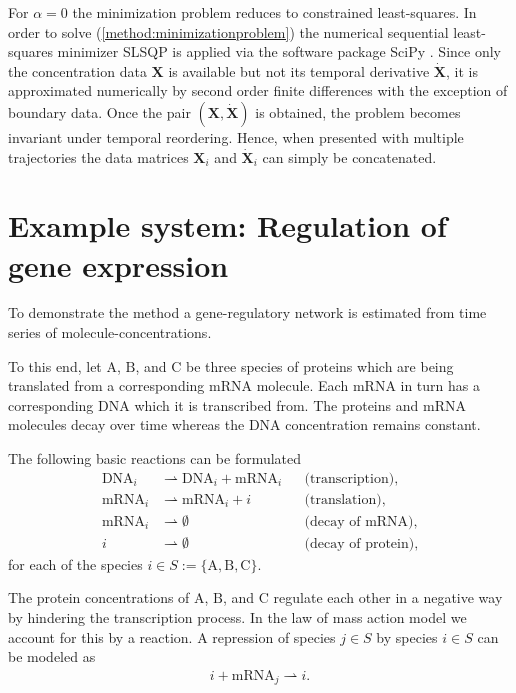 \documentclass[oneside, abstracton, titlepage]{scrartcl}
\begin{document}
	For $\alpha=0$ the minimization problem reduces to constrained least-squares. In order to solve (\ref{method:minimizationproblem}) the numerical sequential least-squares minimizer SLSQP \cite{Kraft1988} is applied via the software package SciPy \cite{SciPy}. Since only the concentration data $\mathbf{X}$ is available but not its temporal derivative $\dot{\mathbf{X}}$, it is approximated numerically by second order finite differences with the exception of boundary data. Once the pair $(\mathbf{X}, \dot{\mathbf{X}})$ is obtained, the problem becomes invariant under temporal reordering. Hence, when presented with multiple trajectories the data matrices $\mathbf{X}_i$ and $\dot{\mathbf{X}}_i$ can simply be concatenated.
	
    \section{Example system: Regulation of gene expression}\label{sec:generegulation}

    To demonstrate the method a gene-regulatory network is estimated from time series of molecule-concentrations.
    
    To this end, let $\mathrm{A}$, $\mathrm{B}$, and $\mathrm{C}$ be three species of proteins which are being translated from a corresponding $\mathrm{mRNA}$ molecule. Each $\mathrm{mRNA}$ in turn has a corresponding $\mathrm{DNA}$ which it is transcribed from. The proteins and $\mathrm{mRNA}$ molecules decay over time whereas the $\mathrm{DNA}$ concentration remains constant.
    
    The following basic reactions can be formulated
	\begin{align*}
		\mathrm{DNA}_i &\rightharpoonup \mathrm{DNA}_i + \mathrm{mRNA}_i &&\text{(transcription)},\\
		\mathrm{mRNA}_i &\rightharpoonup \mathrm{mRNA}_i + i &&\text{(translation)},\\
		\mathrm{mRNA}_i &\rightharpoonup \emptyset &&\text{(decay of mRNA)},\\
		i &\rightharpoonup \emptyset &&\text{(decay of protein)},
    \end{align*}
    for each of the species $i\in S:=\{\mathrm{A},\mathrm{B},\mathrm{C}\}$.

    The protein concentrations of $\mathrm{A}$, $\mathrm{B}$, and $\mathrm{C}$ regulate each other in a negative way by hindering the transcription process. In the law of mass action model we account for this by a reaction. A repression of species $j\in S$ by species $i\in S$ can be modeled as
    \begin{align*}
    i + \mathrm{mRNA}_j \rightharpoonup i.
    \end{align*}
\end{document}
